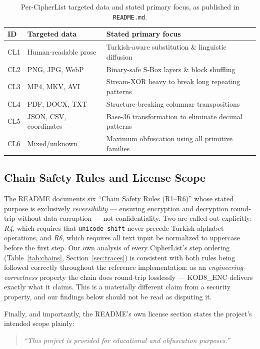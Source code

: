 \documentclass[11pt]{article}
\begin{document}
\begin{table}[h]
\centering
\small
\caption{Per-CipherList targeted data and stated primary focus, as published in \texttt{README.md}.}
\label{tab:readme-cl}
\begin{tabular}{@{}lll@{}}
\toprule
\textbf{ID} & \textbf{Targeted data} & \textbf{Stated primary focus} \\
\midrule
CL1 & Human-readable prose & Turkish-aware substitution \& linguistic diffusion \\
CL2 & PNG, JPG, WebP & Binary-safe S-Box layers \& block shuffling \\
CL3 & MP4, MKV, AVI & Stream-XOR heavy to break long repeating patterns \\
CL4 & PDF, DOCX, TXT & Structure-breaking columnar transpositions \\
CL5 & JSON, CSV, coordinates & Base-36 transformation to eliminate decimal patterns \\
CL6 & Mixed/unknown & Maximum obfuscation using all primitive families \\
\bottomrule
\end{tabular}
\end{table}

\subsection{Chain Safety Rules and License Scope}

The README documents six ``Chain Safety Rules (R1–R6)'' whose
stated purpose is exclusively \emph{reversibility} --- ensuring
encryption and decryption round-trip without data corruption --- not
confidentiality. Two are called out explicitly: \emph{R4}, which
requires that \texttt{unicode\_shift} never precede Turkish-alphabet
operations, and \emph{R6}, which requires all text input be normalized
to uppercase before the first step. Our own analysis of every
CipherList's step ordering (Table~\ref{tab:chains},
Section~\ref{sec:traces}) is consistent with both rules being followed
correctly throughout the reference implementation: as an
\emph{engineering-correctness} property the chain does round-trip
losslessly --- KOD8\_ENC delivers exactly what it claims. This is a
materially different claim from a security property, and our findings
below should not be read as disputing it.

Finally, and importantly, the README's own license section states the
project's intended scope plainly:

\begin{quote}
\itshape
``This project is provided for educational and obfuscation purposes.''
\end{quote}
\end{document}
